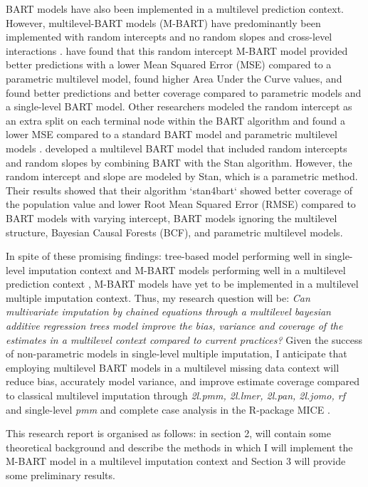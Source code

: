 \documentclass[10pt, a4paper, titlepage]{article}
\begin{document}
BART models have also been implemented in a multilevel prediction context. However, multilevel-BART models (M-BART) have predominantly been implemented with random intercepts and no random slopes and cross-level interactions \citep{chen2020, wagner2020, tan2016, wundervald2022}. \citet{wagner2020} have found that this random intercept M-BART model provided better predictions with a lower Mean Squared Error (MSE) compared to a parametric multilevel model, \citet{tan2016} found higher Area Under the Curve values, and \citet{chen2020} found better predictions and better coverage compared to parametric models and a single-level BART model. Other researchers modeled the random intercept as an extra split on each terminal node within the BART algorithm and found a lower MSE compared to a standard BART model and parametric multilevel models \citep{wundervald2022}. \citet{dorie2022} developed a multilevel BART model that included random intercepts and random slopes by combining BART with the Stan algorithm. However, the random intercept and slope are modeled by Stan, which is a parametric method. Their results showed that their algorithm `stan4bart` showed better coverage of the population value and lower Root Mean Squared Error (RMSE) compared to BART models with varying intercept, BART models ignoring the multilevel structure, Bayesian Causal Forests (BCF), and parametric multilevel models.

In spite of these promising findings: tree-based model performing well in single-level imputation context \citep{burgette2010, xu2016, silva2022, stekhoven2012, waljee2013} and M-BART models performing well in a multilevel prediction context \citep{chen2020, wagner2020, tan2016, wundervald2022, dorie2022}, M-BART models have yet to be implemented in a multilevel multiple imputation context. Thus, my research question will be: \textit{Can multivariate imputation by chained equations through a multilevel bayesian additive regression trees model improve the bias, variance and coverage of the estimates in a multilevel context compared to current practices?} Given the success of non-parametric models in single-level multiple imputation, I anticipate that employing multilevel BART models in a multilevel missing data context will reduce bias, accurately model variance, and improve estimate coverage compared to classical multilevel imputation through \textit{2l.pmm, 2l.lmer, 2l.pan, 2l.jomo, rf} and single-level \textit{pmm} and complete case analysis in the R-package MICE \citep{buuren2011}.

This research report is organised as follows: in section 2, will contain some theoretical background and describe the methods in which I will implement the M-BART model in a multilevel imputation context and Section 3 will provide some preliminary results.
\end{document}
